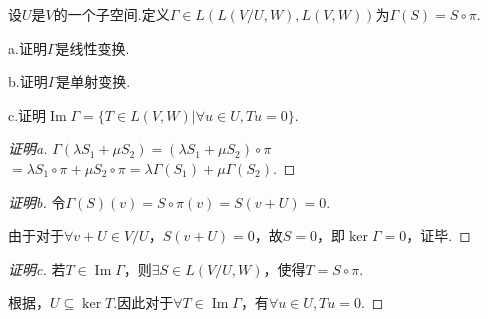 \begin{problem}[20]\label{3.E.20}
    设\(U\)是\(V\)的一个子空间.定义\(\Gamma \in L(L(V/U,W),L(V,W))\)为\(\Gamma(S)=S \circ \pi\).

    a.证明\(\Gamma\)是线性变换.
    
    b.证明\(\Gamma\)是单射变换.
    
    c.证明\(\operatorname{Im}  \Gamma=\{T \in L(V,W)|\forall u \in U,Tu=0 \}\).
\end{problem}

\begin{proof}[证明a]
    \(\Gamma(\lambda S_1+\mu S_2)=(\lambda S_1+\mu S_2) \circ \pi\)
    \(=\lambda S_1 \circ \pi+\mu S_2 \circ \pi=\lambda \Gamma(S_1)+\mu \Gamma(S_2)\).
\end{proof}

\begin{proof}[证明b]
    令\(\Gamma(S)(v)=S \circ \pi(v)=S(v+U)=0\).

    由于对于\(\forall v+U \in V/U\)，\(S(v+U)=0\)，故\(S=0\)，即\(\ker  \Gamma=0\)，证毕.
\end{proof}

\begin{proof}[证明c]
    若\(T \in \operatorname{Im}  \Gamma\)，则\(\exists S \in L(V/U,W)\)，使得\(T=S \circ \pi\).

    根据，\(U \subseteq \ker T\).因此对于\(\forall T \in \operatorname{Im} \Gamma\)，有\(\forall u \in U,Tu=0\).    
\end{proof}

